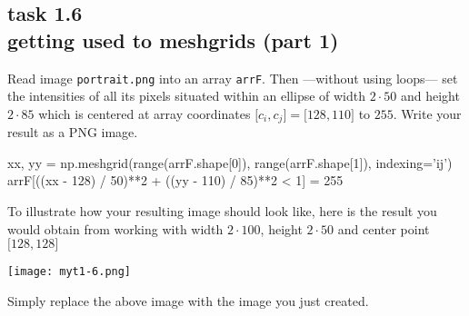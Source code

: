 
\subsection*{task 1.6 \\[1ex] getting used to meshgrids (part 1)}

Read image \texttt{portrait.png} into an array \texttt{arrF}. Then ---without using  loops--- set the intensities of all its pixels situated within an ellipse of width $2 \cdot 50$ and height $2 \cdot 85$ which is centered at array coordinates $\bigl[ c_i, c_j \bigr] = \bigl[ 128, 110 \bigr]$ to $255$. Write your result as a PNG image. \\[1ex]
\begin{python}
xx, yy = np.meshgrid(range(arrF.shape[0]), range(arrF.shape[1]), indexing='ij')
arrF[((xx - 128) / 50)**2 + ((yy - 110) / 85)**2 < 1] = 255
\end{python}



\vspace{1cm}
To illustrate how your resulting image should look like, here is the result you would obtain from working with width $2 \cdot 100$, height $2 \cdot 50$ and center point $\bigl[ 128, 128 \bigr]$
\begin{center}
\texttt{[image: myt1-6.png]} 
\end{center}
Simply replace the above image with the image you just created.






